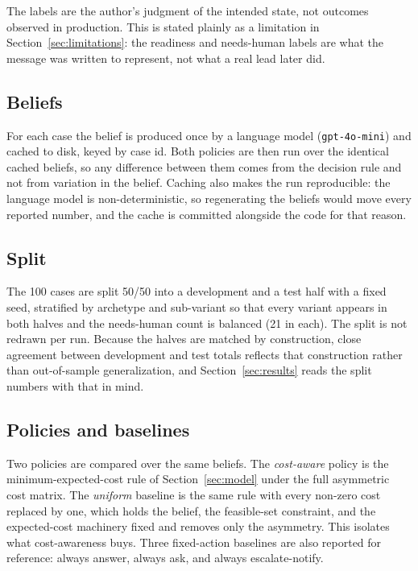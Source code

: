 \documentclass{article}
\begin{document}
The labels are the author's judgment of the intended state, not outcomes observed
in production. This is stated plainly as a limitation in
Section~\ref{sec:limitations}: the readiness and needs-human labels are what the
message was written to represent, not what a real lead later did.

\subsection{Beliefs}
For each case the belief is produced once by a language model
(\texttt{gpt-4o-mini}) and cached to disk, keyed by case id. Both policies are
then run over the identical cached beliefs, so any difference between them comes
from the decision rule and not from variation in the belief. Caching also makes
the run reproducible: the language model is non-deterministic, so regenerating the
beliefs would move every reported number, and the cache is committed alongside the
code for that reason.

\subsection{Split}
The 100 cases are split 50/50 into a development and a test half with a fixed
seed, stratified by archetype and sub-variant so that every variant appears in
both halves and the needs-human count is balanced (21 in each). The split is not
redrawn per run. Because the halves are matched by construction, close agreement
between development and test totals reflects that construction rather than
out-of-sample generalization, and Section~\ref{sec:results} reads the split
numbers with that in mind.

\subsection{Policies and baselines}
Two policies are compared over the same beliefs. The \emph{cost-aware} policy is
the minimum-expected-cost rule of Section~\ref{sec:model} under the full
asymmetric cost matrix. The \emph{uniform} baseline is the same rule with every
non-zero cost replaced by one, which holds the belief, the feasible-set
constraint, and the expected-cost machinery fixed and removes only the asymmetry.
This isolates what cost-awareness buys. Three fixed-action baselines are also
reported for reference: always answer, always ask, and always escalate-notify.
\end{document}
